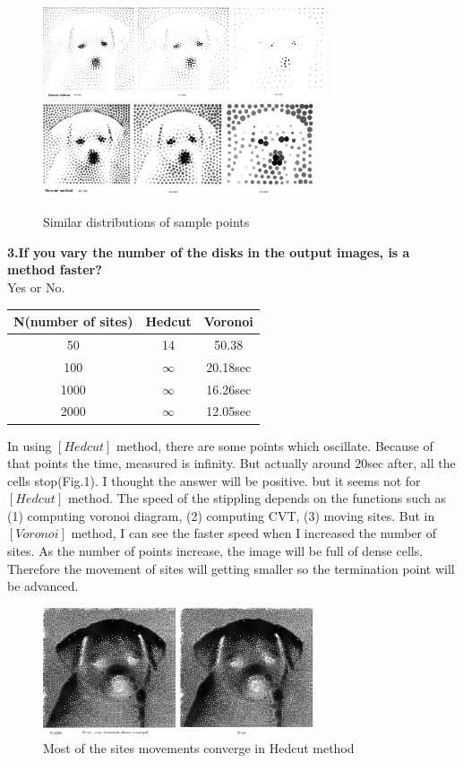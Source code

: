 \documentclass[11pt]{article}
\begin{document}
\smallskip
\begin{figure}[hc]
  \includegraphics[width=83mm]{compare2.jpg}
  \includegraphics[width=80mm]{compare2(vor).jpg}
  \caption{Similar distributions of sample points}  \label{compare1h}
\end{figure}


\textbf{3.If you vary the number of the disks in the output images, is a method faster?}\\
Yes or No.\\
\begin{table}[ht]
\begin{tabular}{c c c}
\hline
 N(number of sites) & Hedcut & Voronoi \\ [0.5ex]
\hline
  50   & 14     & 50.38 \\
  100  & $\infty$ & 20.18sec \\
  1000 & $\infty$ & 16.26sec \\
  2000 & $\infty$ & 12.05sec \\
\hline
\end{tabular}
\end{table}
In using $[Hedcut]$ method, there are some points which oscillate. Because of that points the time, measured is infinity. But actually around 20sec after, all the cells stop(Fig.1).
I thought the answer will be positive. but it seems not for $[Hedcut]$ method. The speed of the stippling depends on the functions such as (1) computing voronoi diagram, (2) computing CVT, (3) moving sites.  But in  $[Voronoi]$ method, I can see the faster speed when I increased the number of sites. As the number of points increase, the image will be full of dense cells. Therefore the movement of sites will getting smaller so the termination point will be advanced.\\

\smallskip
\begin{figure}
\center
  \includegraphics[width=80mm]{compare3(h).jpg}
  \caption{Most of the sites movements converge in Hedcut method }  \label{compare1h}
\end{figure}
\end{document}
